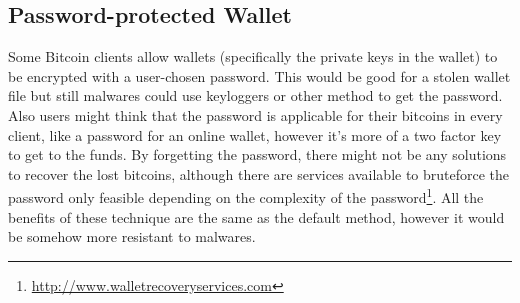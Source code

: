 

\subsection{Password-protected Wallet}
Some Bitcoin clients allow wallets (specifically the private keys in the wallet) to be encrypted with a user-chosen password. This would be good for a stolen wallet file but still malwares could use keyloggers or other method to get the password. Also users might think that the password is applicable for their bitcoins in every client, like a password for an online wallet, however it's more of a two factor key to get to the funds. By forgetting the password, there might not be any solutions to recover the lost bitcoins, although there are services available to bruteforce the password only feasible depending on the complexity of the password\footnote{\url {http://www.walletrecoveryservices.com}}. All the benefits of these technique are the same as the default method, however it would be somehow more resistant to malwares.

 


